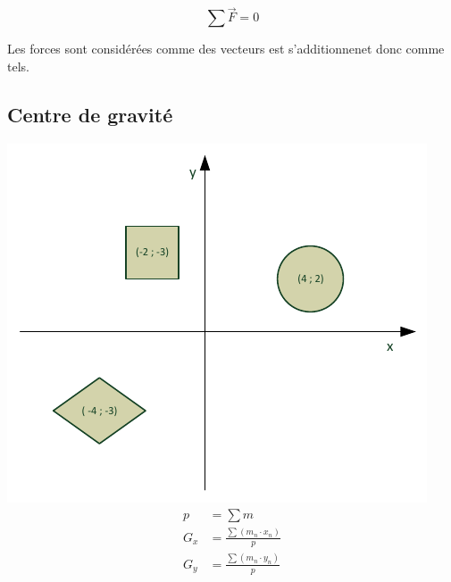 \documentclass[12pt,a4paper]{article} %
\begin{document}
	\[\sum \vec{F} = 0\]

Les forces sont considérées comme des vecteurs est s'additionnenet donc comme tels.

\subsection{Centre de gravité}

\newcommand\fcount[1]{\text{nombre de}\left(#1\right)}

\begin{twocols}[0.5][0.5]
	\includegraphics{Statique-CentreGravite}
\nextcol
	\begin{align*}
		p &= \sum m \\[1em]
		G_x &= \frac{\sum\left(m_n \cdot x_n\right)}{p} \\[1em]
		G_y &= \frac{\sum\left(m_n \cdot y_n\right)}{p} \\
	\end{align*}
\end{twocols}
\end{document}
